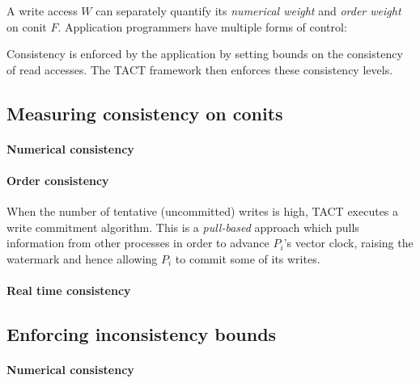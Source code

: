\documentclass[]             %
{NASA}                       %
\theoremstyle{definition}
\begin{document}
A write access \(W\) can separately quantify its \emph{numerical weight}
and \emph{order weight} on conit \(F\). Application programmers have
multiple forms of control:

Consistency is enforced by the application by setting bounds on the
consistency of read accesses. The TACT framework then enforces these
consistency levels.

\hypertarget{measuring-consistency-on-conits}{%
\subsection{Measuring consistency on
conits}\label{measuring-consistency-on-conits}}

\hypertarget{numerical-consistency}{%
\paragraph{Numerical consistency}\label{numerical-consistency}}

\hypertarget{order-consistency}{%
\paragraph{Order consistency}\label{order-consistency}}

When the number of tentative (uncommitted) writes is high, TACT executes
a write commitment algorithm. This is a \emph{pull-based} approach which
pulls information from other processes in order to advance \(P_i\)'s
vector clock, raising the watermark and hence allowing \(P_i\) to commit
some of its writes.

\hypertarget{real-time-consistency}{%
\paragraph{Real time consistency}\label{real-time-consistency}}

\hypertarget{enforcing-inconsistency-bounds}{%
\subsection{Enforcing inconsistency
bounds}\label{enforcing-inconsistency-bounds}}

\hypertarget{numerical-consistency-1}{%
\paragraph{Numerical consistency}\label{numerical-consistency-1}}
\end{document}
